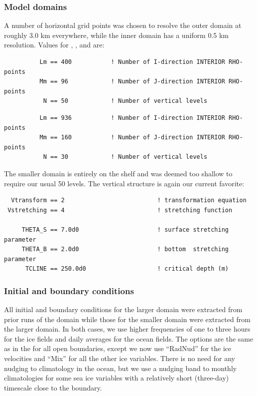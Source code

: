 \subsubsection{Model domains}
A number of horizontal grid points was chosen to resolve the outer
domain at roughly 3.0 km everywhere, while the inner domain has a
uniform 0.5 km resolution. Values for , , and
 are:
\begin{verbatim}
          Lm == 400           ! Number of I-direction INTERIOR RHO-points
          Mm == 96            ! Number of J-direction INTERIOR RHO-points
           N == 50            ! Number of vertical levels
\end{verbatim}
\begin{verbatim}
          Lm == 936           ! Number of I-direction INTERIOR RHO-points
          Mm == 160           ! Number of J-direction INTERIOR RHO-points
           N == 30            ! Number of vertical levels
\end{verbatim}
The smaller domain is entirely on the shelf and was deemed too
shallow to require our usual 50 levels. The vertical structure is
again our current favorite:
\begin{verbatim}
  Vtransform == 2                          ! transformation equation
 Vstretching == 4                          ! stretching function

     THETA_S == 7.0d0                      ! surface stretching parameter
     THETA_B == 2.0d0                      ! bottom  stretching parameter
      TCLINE == 250.0d0                    ! critical depth (m)
\end{verbatim}

\subsubsection{Initial and boundary conditions}
All initial and boundary conditions for the larger domain were
extracted from prior runs of the  domain while those
for the smaller domain were extracted from the larger domain. In
both cases, we use higher frequencies of one to three hours for the
ice fields and daily averages for the ocean fields.  The 
options are the same as in the  for all open boundaries,
except we now use ``RadNud'' for the ice velocities and ``Mix'' for
all the other ice variables. There is no need for any nudging to
climatology in the ocean, but we use a nudging band to monthly
climatologies for some sea ice variables with a relatively short
(three-day) timescale close to the boundary.

